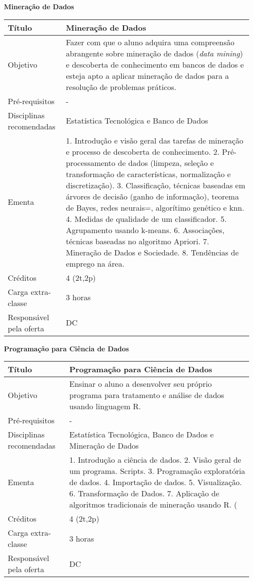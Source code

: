 \textbf{Mineração de Dados}
\begin{center}
\begin{tabular}{|p{4.5cm}|p{10.0cm}|} \hline
Título & Mineração de Dados \\ \hline
Objetivo & Fazer com que o aluno adquira uma compreensão abrangente sobre mineração de dados (\textit{data mining}) e descoberta
de conhecimento em bancos de dados e esteja apto a aplicar mineração de dados para a resolução de problemas práticos. \\ \hline
Pré-requisitos & - \\ \hline
Disciplinas recomendadas & Estatística Tecnológica e Banco de Dados \\ \hline
Ementa & 1. Introdução e visão geral das tarefas de mineração e processo de descoberta de conhecimento. 2. Pré-processamento de dados (limpeza, seleção e transformação de características, normalização e discretização). 3. Classificação, técnicas baseadas em árvores de decisão (ganho de informação), teorema de Bayes, redes neurais=, algorítimo genético e knn. 4. Medidas de qualidade de um classificador. 5.  Agrupamento usando k-means. 6. Associações, técnicas baseadas no algoritmo Apriori. 7. Mineração de Dados e Sociedade. 8. Tendências de emprego na área.\\ \hline
Créditos & 4 (2t,2p) \\ \hline
Carga extra-classe & 3 horas  \\ \hline
Responsável pela oferta & DC \\ \hline
\end{tabular}
\end{center}

\textbf{Programação para Ciência de Dados}
\begin{center}
\begin{tabular}{|p{4.5cm}|p{10.0cm}|} \hline
Título & Programação para Ciência de Dados \\ \hline
Objetivo & Ensinar o aluno a desenvolver seu próprio programa para tratamento e análise de dados usando linguagem R. \\ \hline
Pré-requisitos & - \\ \hline
Disciplinas recomendadas & Estatística Tecnológica,  Banco de Dados e Mineração de Dados\\ \hline
Ementa & 1. Introdução a ciência de dados. 2. Visão geral de um programa. Scripts.  3. Programação exploratória de dados. 4. Importação de dados. 5. Visualização. 6. Transformação de Dados. 7. Aplicação de algoritmos tradicionais de mineração usando R.  ( \\ \hline
Créditos & 4 (2t,2p) \\ \hline
Carga extra-classe & 3 horas  \\ \hline
Responsável pela oferta & DC \\ \hline
\end{tabular}
\end{center}

